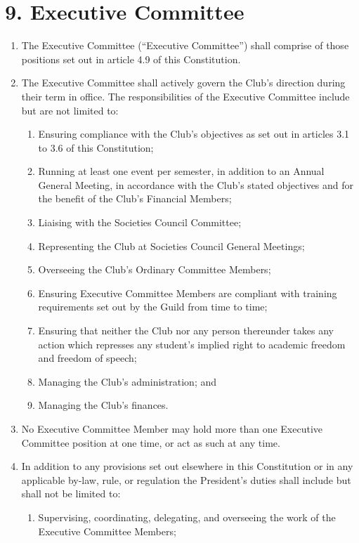 \documentclass[12pt]{article}
\begin{document}
\section{9. Executive Committee}
\begin{enumerate}[label=9.\arabic*]
\item The Executive Committee (``Executive Committee'') shall comprise of those positions set out in article 4.9 of this Constitution.
\item The Executive Committee shall actively govern the Club's direction during their term in office. The responsibilities of the Executive Committee include but are not limited to:
    \begin{enumerate}[label=\theenumi.\arabic*]
        \item Ensuring compliance with the Club's objectives as set out in articles 3.1 to 3.6 of this Constitution;
        \item Running at least one event per semester, in addition to an Annual General Meeting, in accordance with the Club's stated objectives and for the benefit of the Club's Financial Members;
        \item Liaising with the Societies Council Committee;
        \item Representing the Club at Societies Council General Meetings;
        \item Overseeing the Club's Ordinary Committee Members;
        \item Ensuring Executive Committee Members are compliant with training requirements set out by the Guild from time to time;
        \item Ensuring that neither the Club nor any person thereunder takes any action which represses any student's implied right to academic freedom and freedom of speech;
        \item Managing the Club's administration; and
        \item Managing the Club's finances.
    \end{enumerate}
\item No Executive Committee Member may hold more than one Executive Committee position at one time, or act as such at any time.
\item In addition to any provisions set out elsewhere in this Constitution or in any applicable by-law, rule, or regulation the President's duties shall include but shall not be limited to:
    \begin{enumerate}[label=\theenumi.\arabic*]
        \item Supervising, coordinating, delegating, and overseeing the work of the Executive Committee Members;

\end{enumerate}
\end{enumerate}
\end{document}
